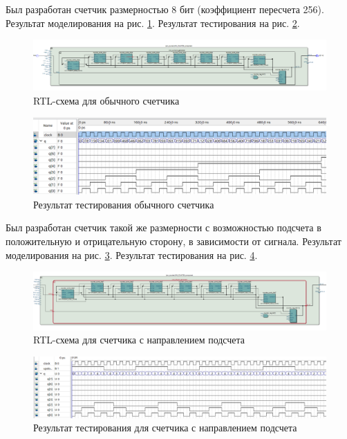 \documentclass[a4paper,14pt]{article}
\begin{document}
	Был разработан счетчик размерностью 8 бит (коэффициент пересчета 256).
	Результат моделирования на рис. \ref{fig:z1_rtl}. Результат тестирования на рис. \ref{fig:z1_test}.
	 
	\begin{figure}[H]
		\centering
		\includegraphics[width=\linewidth]{images/z1_rtl}
		\caption{RTL-схема для обычного счетчика}
		\label{fig:z1_rtl}
	\end{figure}

	\begin{figure}[H]
		\centering
		\includegraphics[width=\linewidth]{images/z1_test}
		\caption{Результат тестирования обычного счетчика}
		\label{fig:z1_test}
	\end{figure}

	Был разработан счетчик такой же размерности с возможностью подсчета в положительную и отрицательную сторону, в зависимости от сигнала.
	Результат моделирования на рис. \ref{fig:z2_rtl}. Результат тестирования на рис. \ref{fig:z2_test}.
	
	\begin{figure}[H]
		\centering
		\includegraphics[width=\linewidth]{images/z2_rtl}
		\caption{RTL-схема для счетчика с направлением подсчета}
		\label{fig:z2_rtl}
	\end{figure}
	
	\begin{figure}[H]
		\centering
		\includegraphics[width=\linewidth]{images/z2_test}
		\caption{Результат тестирования для счетчика с направлением подсчета}
		\label{fig:z2_test}
	\end{figure}
\end{document}
